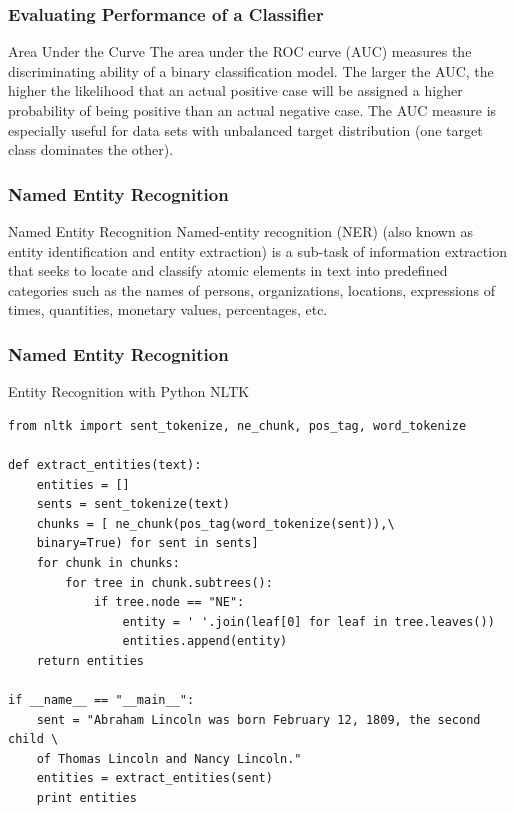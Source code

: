 \documentclass[serif,11pt,aspectratio=1610,table]{beamer}
\begin{document}
\begin{frame}
 \frametitle{Evaluating Performance of a Classifier}
\begin{block}{Area Under the Curve}
 The area under the ROC curve (AUC) measures the discriminating ability of a binary classification model. The larger the AUC, the higher the likelihood that an actual positive case will be assigned a higher probability of being positive than an actual negative case. The AUC measure is especially useful for data sets with unbalanced target distribution (one target class dominates the other).
\end{block}

\end{frame}


\begin{frame}
 \frametitle{Named Entity Recognition}
\begin{block}{Named Entity Recognition}
 Named-entity recognition (NER) (also known as entity identification and entity extraction) is a sub-task of information extraction that seeks to locate and classify atomic elements in text into predefined categories such as the names of persons, organizations, locations, expressions of times, quantities, monetary values, percentages, etc.
\end{block}

\end{frame}

\begin{frame}[fragile]
 \frametitle{Named Entity Recognition}
\footnotesize
Entity Recognition with Python NLTK
\begin{verbatim}
from nltk import sent_tokenize, ne_chunk, pos_tag, word_tokenize

def extract_entities(text):
    entities = []
    sents = sent_tokenize(text)
    chunks = [ ne_chunk(pos_tag(word_tokenize(sent)),\
    binary=True) for sent in sents]
    for chunk in chunks:
        for tree in chunk.subtrees():
            if tree.node == "NE":
                entity = ' '.join(leaf[0] for leaf in tree.leaves())
                entities.append(entity)
    return entities

if __name__ == "__main__":
    sent = "Abraham Lincoln was born February 12, 1809, the second child \
    of Thomas Lincoln and Nancy Lincoln."
    entities = extract_entities(sent)
    print entities

\end{verbatim}

\end{frame}
\end{document}
